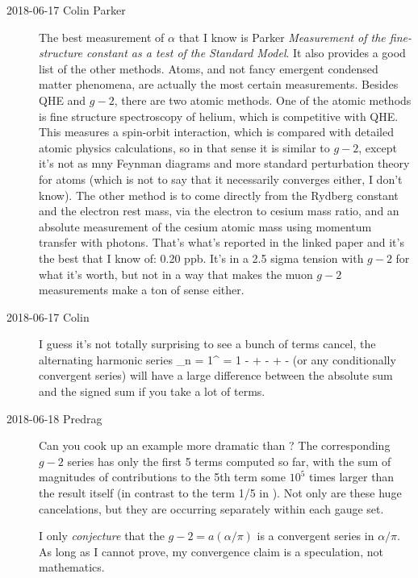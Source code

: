 \begin{description}
\item[2018-06-17 Colin Parker]
The best measurement of $\alpha$ that I know is Parker \etal{}
{\em Measurement of the fine-structure constant as a test of the
{Standard Model}}.
It also provides a good list of the other
methods. Atoms, and not fancy emergent condensed matter phenomena, are
actually the most certain measurements. Besides QHE and $g-2$, there are
two atomic methods. One of the atomic methods is fine structure
spectroscopy of helium, which is competitive with QHE. This measures a
spin-orbit interaction, which is compared with detailed atomic physics
calculations, so in that sense it is similar to $g-2$, except it's not as
mny Feynman diagrams and more standard perturbation theory for atoms
(which is not to say that it necessarily converges either, I don't know).
The other method is to come directly from the Rydberg constant and the
electron rest mass, via the electron to cesium mass ratio, and an absolute
measurement of the cesium atomic mass using momentum transfer with
photons. That's what's reported in the linked paper and it's the best
that I know of: 0.20 ppb. It's in a 2.5 sigma tension with $g-2$ for what
it's worth, but not in a way that makes the muon $g-2$ measurements make a
ton of sense either.

\item[2018-06-17 Colin]
I guess it's not totally surprising to see a bunch of terms cancel, the
alternating harmonic series
\beq
\sum_{n = 1}^\infty {}
= 1 -  +  -  +  - \cdots
{}
(or any conditionally convergent series) will have a large difference
between the absolute sum and the signed sum if you take a lot of terms.

\item[2018-06-18 Predrag] Can you cook up an example more dramatic than
? The corresponding $g-2$ series has only the first 5
terms computed so far, with the sum of magnitudes of contributions to the
5th term some $10^5$ times larger than the result itself (in contrast to
the term 1/5 in ). Not only are these huge
cancelations, but they are occurring separately within each gauge set.

I only \emph{conjecture} that the $g-2=a(\alpha/\pi)$ is a convergent
series in $\alpha/\pi$. As long as I cannot prove, my convergence claim
is a speculation, not mathematics.


\end{description}
